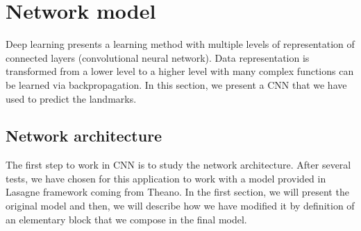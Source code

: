 \documentclass[10pt]{article}
\begin{document}

\section{Network model}
Deep learning presents a learning method with multiple levels of representation of connected layers (convolutional neural network). Data representation is transformed from a lower level to a higher level with many complex functions can be learned via backpropagation. In this section, we present a CNN that we have used to predict the landmarks.
\subsection{Network architecture}
\label{secmodel}
The first step to work in CNN is to study the network architecture. After several tests, we have chosen for this application to work with a model provided in Lasagne framework coming from Theano. In the first section, we will present the original model and then, we will describe how we have modified it by definition of an elementary block that we compose in the final model.
\end{document}
